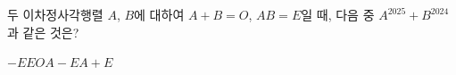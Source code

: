 \hspace*{2mm}\begin{minipage}[t]{\dimexpr\linewidth-2mm\relax}\vspace{0pt}
두 이차정사각행렬 $A$, $B$에 대하여 $A+B=O$, $AB=E$일 때, 다음 중 $A^{2025}+B^{2024}$과 같은 것은? 
\begin{choices32}{$-E$}{$E$}{$O$}{$A-E$}{$A+E$}\end{choices32}\end{minipage}
